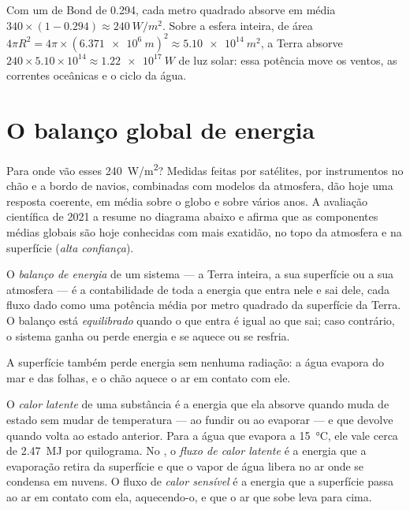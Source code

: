 \begin{example}\label{ex:g10:earth-energy-budget:absorbed}
Com um  de Bond de 0.294, cada metro quadrado absorve em média $340
\times (1 - 0.294) \approx \qty{240}{W/m^2}$. Sobre a esfera inteira, de
área $4\pi R^2 = 4\pi \times (\qty{6.371e6}{m})^2 \approx \qty{5.10e14}{m^2}$,
a Terra absorve $240 \times 5.10\times10^{14} \approx \qty{1.22e17}{W}$ de
luz solar: essa potência move os ventos, as correntes oceânicas e o ciclo
da água.
\end{example}

\section{O balanço global de energia}

Para onde vão esses \qty{240}{W/m^2}? Medidas feitas por satélites, por
instrumentos no chão e a bordo de navios, combinadas com modelos da
atmosfera, dão hoje uma resposta coerente, em média sobre o globo e sobre
vários anos. A avaliação científica de 2021 a resume no diagrama abaixo e
afirma que as componentes médias globais são hoje conhecidas com mais
exatidão, no topo da atmosfera e na superfície (\emph{alta confiança}).

\begin{definition}\label{def:g10:earth-energy-budget:energy-budget}
O \emph{balanço de energia} de
um sistema --- a Terra inteira, a sua superfície ou a sua atmosfera --- é a
contabilidade de toda a energia que entra nele e sai dele, cada fluxo dado
como uma potência média por metro quadrado da superfície da Terra. O
balanço está \emph{equilibrado} quando o que entra é igual ao que sai; caso
contrário, o sistema ganha ou perde energia e se aquece ou se resfria.
\end{definition}

A superfície também perde energia sem nenhuma radiação: a água evapora do
mar e das folhas, e o chão aquece o ar em contato com ele.

\begin{definition}\label{def:g10:earth-energy-budget:latent-heat}
O \emph{calor latente} de uma substância é a energia
que ela absorve quando muda de estado sem mudar de temperatura --- ao
fundir ou ao evaporar --- e que devolve quando volta ao estado anterior.
Para a água que evapora a \qty{15}{\degreeCelsius}, ele vale cerca de
\qty{2.47}{MJ} por quilograma. No , o \emph{fluxo de calor
latente} é a energia que a evaporação retira da superfície e que o vapor de
água libera no ar onde se condensa em nuvens. O fluxo de
\emph{calor sensível} é a energia que a
superfície passa ao ar em contato com ela, aquecendo-o, e que o ar que sobe
leva para cima.
\end{definition}


